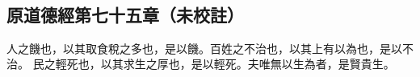 ﻿%
%

\chapter{~}

\section{原道德經第七十五章（未校註）}

\begin{withgezhu}

\zhsong


人之饑也，以其取食稅之多也，是以饑。百姓之不治也，以其上有以為也，是以不治。
民之輕死也，以其求生之厚也，是以輕死。夫唯無以生為者，是賢貴生。

\end{withgezhu}
